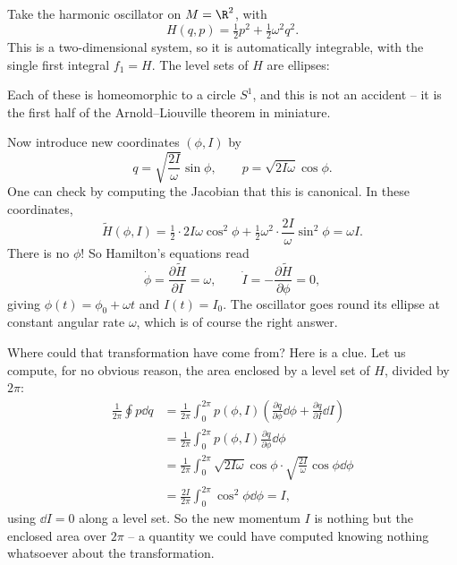 \begin{example}
	Take the harmonic oscillator on $M = \R^2$, with
	$$
	H(q,p) = \tfrac{1}{2}p^2 + \tfrac{1}{2}\omega^2 q^2.
	$$
	This is a two-dimensional system, so it is automatically integrable, with the single first integral $f_1 = H$. The level sets of $H$ are ellipses:
	\begin{center}
	\end{center}
	Each of these is homeomorphic to a circle $S^1$, and this is not an accident -- it is the first half of the Arnold--Liouville theorem in miniature.

	Now introduce new coordinates $(\phi, I)$ by
	$$
	q = \sqrt{\frac{2I}{\omega}}\sin\phi, \qquad p = \sqrt{2I\omega}\cos\phi.
	$$
	One can check by computing the Jacobian that this is canonical. In these coordinates,
	$$
	\tilde H(\phi, I) = \tfrac{1}{2}\cdot 2I\omega\cos^2\phi + \tfrac{1}{2}\omega^2\cdot\frac{2I}{\omega}\sin^2\phi = \omega I.
	$$
	There is no $\phi$! So Hamilton's equations read
	$$
	\dot\phi = \frac{\partial \tilde H}{\partial I} = \omega, \qquad \dot I = -\frac{\partial \tilde H}{\partial\phi} = 0,
	$$
	giving $\phi(t) = \phi_0 + \omega t$ and $I(t) = I_0$. The oscillator goes round its ellipse at constant angular rate $\omega$, which is of course the right answer.

	Where could that transformation have come from? Here is a clue. Let us compute, for no obvious reason, the area enclosed by a level set of $H$, divided by $2\pi$:
	\begin{align*}
		\frac{1}{2\pi}\oint p \dd q &= \frac{1}{2\pi}\int_0^{2\pi} p(\phi, I)\left(\frac{\partial q}{\partial\phi}\dd\phi + \frac{\partial q}{\partial I}\dd I\right)\\
		&= \frac{1}{2\pi}\int_0^{2\pi}p(\phi,I)\frac{\partial q}{\partial \phi}\dd\phi\\
		&= \frac{1}{2\pi}\int_0^{2\pi}\sqrt{2I\omega}\cos\phi\cdot\sqrt{\frac{2I}{\omega}}\cos\phi \dd\phi\\
		&= \frac{2I}{2\pi}\int_0^{2\pi}\cos^2\phi \dd\phi = I,
	\end{align*}
	using $\dd I = 0$ along a level set. So the new momentum $I$ is nothing but the enclosed area over $2\pi$ -- a quantity we could have computed knowing nothing whatsoever about the transformation.
\end{example}

